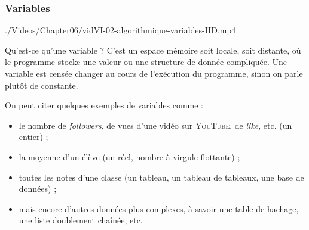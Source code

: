 \subsubsection[Variables]{Variables}
\label{subsub:VI.1.1.2}

\begin{marginvideo}
		{./Videos/Chapter06/vidVI-02-algorithmique-variables-HD.mp4}%
\end{marginvideo}

Qu'est-ce qu'une variable ? C'est un espace mémoire soit locale, soit distante, où le programme stocke une valeur ou une structure de donnée compliquée. Une variable est censée changer au cours de l'exécution du programme, sinon on parle plutôt de constante.

On peut citer quelques exemples de variables comme :
\begin{itemize}
\item  le nombre de \textit{followers}, de vues d'une vidéo sur \textsc{YouTube}, de \textit{like}, etc. (un entier) ;
\item la moyenne d'un élève (un réel, nombre à virgule flottante) ;
\item toutes les notes d'une classe (un tableau, un tableau de tableaux, une base de données) ;
\item mais encore d'autres données plus complexes, à savoir une table de hachage, une liste doublement chaînée, etc.
\end{itemize}

